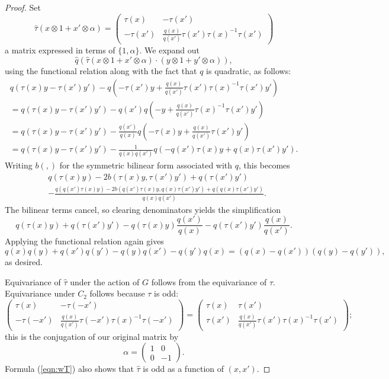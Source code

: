 \documentclass[10pt,a4paper]{amsart}
\newcommand{\wQ}{\widehat{q}}
\newcommand{\wT}{\widehat{\tau}}
\begin{document}
\begin{proof}
Set 
\begin{equation}
\wT(x \otimes 1 + x' \otimes \alpha)
= \left(
\begin{matrix} \tau(x) & -\tau(x') \\
        -\tau(x') & \frac{q(x)}{q(x')}\tau(x')\tau(x)^{-1}\tau(x')
        \end{matrix} \right)
\label{eqn:wT}
\end{equation}
a matrix expressed in terms of $\{1,\alpha \}.$
We expand out 
$$\wQ\left(\wT(x\otimes 1 + x'\otimes \alpha)\cdot
(y\otimes 1 + y'\otimes \alpha)\right),$$
using the functional relation along with the fact
that $q$ is quadratic, as follows:
\begin{align*}
q(\tau(x)y - \tau(x')y') - 
q(-\tau(x')y+\frac{q(x)}{q(x')}\tau(x')\tau(x)^{-1}\tau(x')y')  \\
= 
q(\tau(x)y - \tau(x')y') - 
q(x') q(-y+\frac{q(x)}{q(x')}\tau(x)^{-1}\tau(x')y')\\
=
q(\tau(x)y - \tau(x')y') - 
\frac{q(x')}{q(x)} q(-\tau(x)y+\frac{q(x)}{q(x')}\tau(x')y') \\
= q(\tau(x)y - \tau(x')y') - \frac{1}{q(x)q(x')}
q(-q(x')\tau(x)y+q(x)\tau(x')y').
\end{align*}
Writing $b(,)$ for the symmetric bilinear form 
associated with $q$, this becomes
\begin{align*}
&q(\tau(x)y) - 2b(\tau(x)y,\tau(x')y')+q(\tau(x')y') \\
&-\frac{q(q(x')\tau(x)y)-2b(q(x')\tau(x)y,q(x)\tau(x')y') + q(q(x)\tau(x')y')}{q(x)q(x')}.
\end{align*}
The bilinear terms cancel, so clearing denominators
yields the simplification
$$q(\tau(x)y) + q(\tau(x')y') - q(\tau(x)y)\frac{q(x')}{q(x)}
- q(\tau(x')y') \frac{q(x)}{q(x')}.$$
Applying the functional relation again gives
$$q(x)q(y) + q(x')q(y') - q(y)q(x') - q(y')q(x)
=(q(x)-q(x'))(q(y)-q(y')),$$
as desired.

Equivariance of $\wT$ under the action of $G$ follows from the equivariance of $\tau$. Equivariance under
$C_2$ follows because $\tau$ is odd:
$$\left(
\begin{matrix} \tau(x) & -\tau(-x') \\
        -\tau(-x') & \frac{q(x)}{q(x')}\tau(-x')\tau(x)^{-1}\tau(-x')
        \end{matrix} \right)
        =
        \left(
\begin{matrix} \tau(x) & \tau(x') \\
        \tau(x') & \frac{q(x)}{q(x')}\tau(x')\tau(x)^{-1}\tau(x')
        \end{matrix} \right); 
$$
this is the conjugation of our original matrix by
$$\alpha = \left( \begin{matrix} 1 & 0 \\ 0 & -1 \end{matrix}
\right).$$
Formula (\ref{eqn:wT}) also shows that $\wT$ is odd 
as a function of $(x,x')$.
\end{proof}
\end{document}
